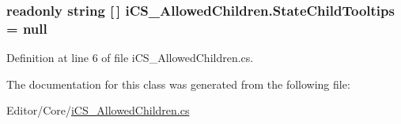 \hypertarget{classi_c_s___allowed_children_a672be128bd97fceabd66df730ea65aed}{
\subsubsection[{State\+Child\+Tooltips}]{\setlength{\rightskip}{0pt plus 5cm}readonly string \mbox{[}$\,$\mbox{]} i\+C\+S\+\_\+\+Allowed\+Children.\+State\+Child\+Tooltips = null\hspace{0.3cm}{\ttfamily [static]}}}\label{classi_c_s___allowed_children_a672be128bd97fceabd66df730ea65aed}


Definition at line 6 of file i\+C\+S\+\_\+\+Allowed\+Children.\+cs.



The documentation for this class was generated from the following file\+:\begin{DoxyCompactItemize}
\item 
Editor/\+Core/\hyperlink{i_c_s___allowed_children_8cs}{i\+C\+S\+\_\+\+Allowed\+Children.\+cs}\end{DoxyCompactItemize}
